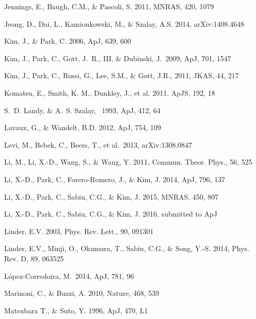 \documentclass[useAMS,usenatbib]{mnras}
\begin{document}
\begin{thebibliography}{}
Jennings, E., Baugh, C.M., \& Pascoli, S. 2011, MNRAS, 420, 1079  

Jeong, D., Dai, L., Kamionkowski, M., \& Szalay, A.S. 2014, arXiv:1408.4648

Kim, J., \& Park, C. 2006, ApJ, 639, 600  

 Kim, J., Park, C., Gott, 
J.~R., III, \& Dubinski, J.\ 2009, ApJ, 701, 1547 

Kim, J., Park, C., Rossi, G., Lee, S.M., \& Gott, J.R., 2011, JKAS, 44, 217  

Komatsu, E., Smith, K. M., Dunkley, J., et al. 2011, ApJS, 192, 18  

 S.~D. Landy, \& A.~S. Szalay, \ 1993, ApJ, 412, 64 

Lavaux, G., \& Wandelt, B.D. 2012, ApJ, 754, 109  

Levi, M., Bebek, C., Beers, T., et al.\ 2013, arXiv:1308.0847 

Li, M., Li, X.-D., Wang, S., \& Wang, Y. 2011, Commun. Theor. Phys., 56, 525

Li, X.-D., Park, C., Forero-Romero, J., \& Kim, J. 2014, ApJ, 796, 137

Li, X.-D., Park, C., Sabiu, C.G., \& Kim, J. 2015, MNRAS, 450, 807 

Li, X.-D., Park, C., Sabiu, C.G., \& Kim, J. 2016, submitted to ApJ


Linder, E.V. 2003, Phys. Rev. Lett., 90, 091301

Linder, E.V., Minji, O., Okumura, T., Sabiu, C.G., \& Song, Y.-S. 2014, Phys. Rev. D, 89, 063525  

L{\'o}pez-Corredoira, M.\ 2014, ApJ, 781, 96 

Marinoni, C., \& Buzzi, A. 2010, Nature, 468, 539  

Matsubara T., \& Suto, Y. 1996, ApJ, 470, L1  


\end{thebibliography}
\end{document}
